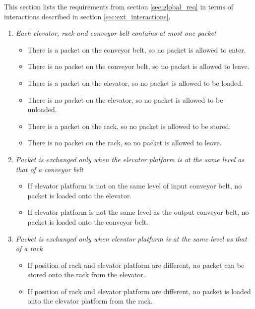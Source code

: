 
This section lists the requirements from section \ref{sec:global_req} in terms of interactions described in section \ref{sec:ext_interactions}.

\begin{enumerate}
\item \textit{Each elevator, rack and conveyor belt contains at most one packet}
	\begin{itemize}
	\item There is a packet on the conveyor belt, so no
	packet is allowed to enter.
	\item There is no packet on the conveyor belt, so no 
	packet is allowed to leave.	
	\item There is a packet on the elevator, so no packet is 
	allowed to be loaded.
	\item There is no packet on the elevator, so no packet is 
	allowed to be unloaded.
	\item There is a packet on the rack, so no packet is 
	allowed to be stored.
	\item There is no packet on the rack, so no packet is 
	allowed to leave.
	\end{itemize}
\item \textit{ Packet is exchanged only when the elevator platform is at the same level as that of a conveyor belt}
	\begin{itemize}
	\item  If elevator platform is not on the same level of input 
	conveyor belt, no packet is loaded onto the elevator.
	\item If elevator platform is not the same level as the output 
	conveyor belt, no packet is loaded onto the conveyor belt.
	\end{itemize}

\item \textit{Packet is exchanged only when elevator platform is at the same level as that of a rack}
	\begin{itemize}
	\item  If position of rack and elevator platform are different, no
	packet can be stored onto the rack from the elevator.
	\item  If position of rack and elevator platform are different, no
	packet is loaded onto the elevator platform from the rack.
	\end{itemize}


\end{enumerate}
